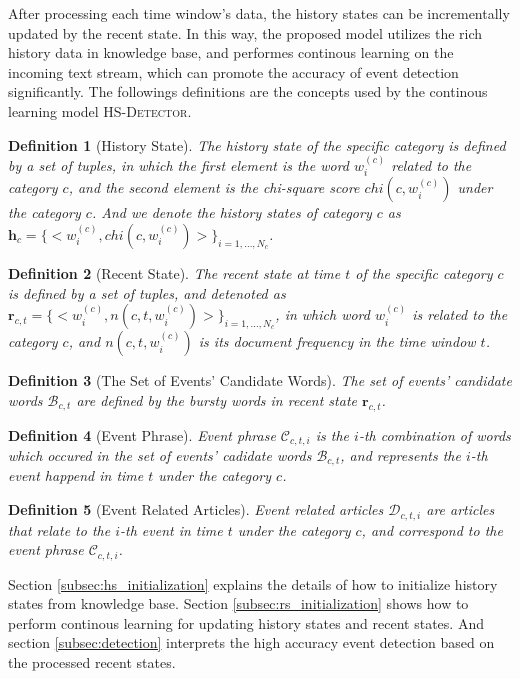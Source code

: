 \documentclass[conference,compsoc]{IEEEtran}
\newtheorem{rmk}{Definition}%
\begin{document}
After processing each time window's data, the history states can be incrementally updated by the recent state. 
In this way, the proposed model utilizes the rich history data in knowledge base, and performes continous learning on the incoming text stream, which can promote the accuracy of event detection significantly. 
The followings definitions are the concepts used by the continous learning model \textsc{HS-Detector}. 


\begin{rmk}[History State] 
The history state of the specific category is defined by a set of tuples, in which the first element is the word \(w^{(c)}_i\) related to the category \(c\), and the second element is the chi-square score \(chi(c,w^{(c)}_{i})\) under the category \(c\). 
And we denote the history states of category \(c\) as \(\bm{h}_c=\{<w^{(c)}_i,chi(c,w^{(c)}_{i})>\}_{i=1,...,N_c}\).
\end{rmk}

\begin{rmk}[Recent State] 
The recent state at time \(t\) of the specific category \(c\) is defined by a set of tuples, and detenoted as \(\bm{r}_{c,t}=\{<w^{(c)}_i,n(c,t,w^{(c)}_{i})>\}_{i=1,...,N_c}\), in which word \(w^{(c)}_{i}\) is related to the category \(c\), and \(n(c,t,w^{(c)}_{i})\) is its document frequency in the time window \(t\).
\end{rmk}


\begin{rmk}[The Set of Events' Candidate Words] 
The set of events' candidate words \(\mathcal{B}_{c,t}\) are defined by the bursty words in recent state \(\bm{r}_{c,t}\).
\end{rmk}

\begin{rmk}[Event Phrase] 
Event phrase \(\mathcal{C}_{c,t,i}\) is the \(i\)-th combination of words which occured in the set of events' cadidate words \(\mathcal{B}_{c,t}\), and represents the \(i\)-th event happend in time \(t\) under the category \(c\).
\end{rmk}

\begin{rmk}[Event Related Articles] Event related articles \(\mathcal{D}_{c,t,i}\) are articles that relate to the \(i\)-th event in time \(t\) under the category \(c\), and correspond to the event phrase \(\mathcal{C}_{c,t,i}\).
\end{rmk}

Section \ref{subsec:hs_initialization} explains the details of how to initialize history states from knowledge base.
Section \ref{subsec:rs_initialization} shows how to perform continous learning for updating history states and recent states.
And section \ref{subsec:detection} interprets the high accuracy event detection based on the processed recent states.
\end{document}
